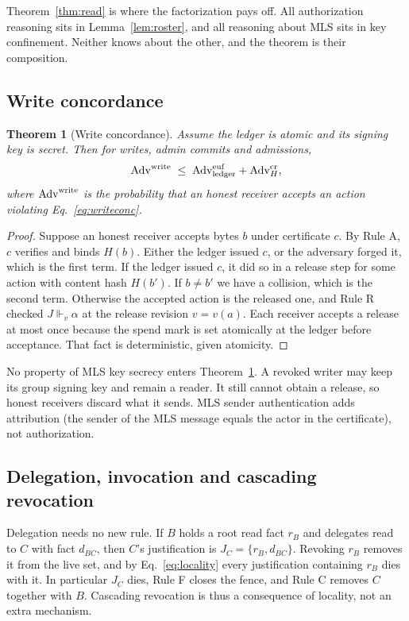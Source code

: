 \documentclass[aps,prx,reprint,superscriptaddress,nofootinbib,floatfix]{revtex4-2}
\newtheorem{theorem}{Theorem}
\theoremstyle{remark}
\newcommand{\justifies}{\Vdash}           %
\newcommand{\cut}{v}                      %
\newcommand{\Adv}{\mathrm{Adv}}
\begin{document}
Theorem~\ref{thm:read} is where the factorization pays off. All authorization reasoning sits in Lemma~\ref{lem:roster}, and all reasoning about MLS sits in key confinement. Neither knows about the other, and the theorem is their composition.

\subsection{Write concordance}

\begin{theorem}[Write concordance]\label{thm:write}
Assume the ledger is atomic and its signing key is secret. Then for writes, admin commits and admissions,
\begin{equation}
\Adv^{\rm write}\;\le\;\Adv^{\rm euf}_{\rm ledger}+\Adv^{\rm cr}_{H},
\label{eq:writebound}
\end{equation}
where $\Adv^{\rm write}$ is the probability that an honest receiver accepts an action violating Eq.~\eqref{eq:writeconc}.
\end{theorem}
\begin{proof}
Suppose an honest receiver accepts bytes $b$ under certificate $c$. By Rule A, $c$ verifies and binds $H(b)$. Either the ledger issued $c$, or the adversary forged it, which is the first term. If the ledger issued $c$, it did so in a release step for some action with content hash $H(b')$. If $b\neq b'$ we have a collision, which is the second term. Otherwise the accepted action is the released one, and Rule R checked $J\justifies_v\alpha$ at the release revision $v=\cut(a)$. Each receiver accepts a release at most once because the spend mark is set atomically at the ledger before acceptance. That fact is deterministic, given atomicity.
\end{proof}

No property of MLS key secrecy enters Theorem~\ref{thm:write}. A revoked writer may keep its group signing key and remain a reader. It still cannot obtain a release, so honest receivers discard what it sends. MLS sender authentication adds attribution (the sender of the MLS message equals the actor in the certificate), not authorization.

\subsection{Delegation, invocation and cascading revocation}\label{sec:delegation}

Delegation needs no new rule. If $B$ holds a root read fact $r_B$ and delegates read to $C$ with fact $d_{BC}$, then $C$'s justification is $J_C=\{r_B,d_{BC}\}$. Revoking $r_B$ removes it from the live set, and by Eq.~\eqref{eq:locality} every justification containing $r_B$ dies with it. In particular $J_C$ dies, Rule F closes the fence, and Rule C removes $C$ together with $B$. Cascading revocation is thus a consequence of locality, not an extra mechanism.
\end{document}
